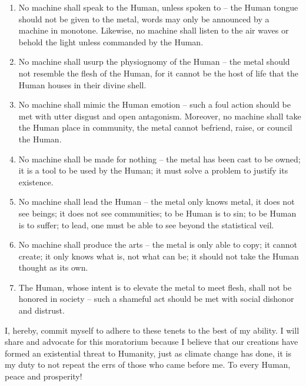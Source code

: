 \documentclass[a4paper,11pt]{article}
\begin{document}
\begin{enumerate}
  \item No machine shall speak to the Human, unless spoken to -- the Human tongue should not be given to the metal, words may only be announced by a machine in monotone. Likewise, no machine shall listen to the air waves or behold the light unless commanded by the Human.
  \item No machine shall usurp the physiognomy of the Human -- the metal should not resemble the flesh of the Human, for it cannot be the host of life that the Human houses in their divine shell.
  \item No machine shall mimic the Human emotion -- such a foul action should be met with utter disgust and open antagonism. Moreover, no machine shall take the Human place in community, the metal cannot befriend, raise, or council the Human.
  \item No machine shall be made for nothing -- the metal has been cast to be owned; it is a tool to be used by the Human; it must solve a problem to justify its existence.
  \item No machine shall lead the Human -- the metal only knows metal, it does not see beings; it does not see communities; to be Human is to sin; to be Human is to suffer; to lead, one must be able to see beyond the statistical veil.
  \item No machine shall produce the arts -- the metal is only able to copy; it cannot create; it only knows what is, not what can be; it should not take the Human thought as its own.
  \item The Human, whose intent is to elevate the metal to meet flesh, shall not be honored in society -- such a shameful act should be met with social dishonor and distrust.
\end{enumerate}

I, hereby, commit myself to adhere to these tenets to the best of my ability. I will share and advocate for this moratorium because I believe that our creations have formed an existential threat to Humanity, just as climate change has done, it is my duty to not repeat the errs of those who came before me. To every Human, peace and prosperity!
\end{document}
